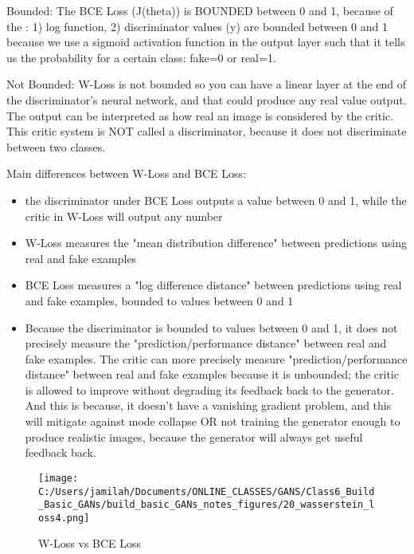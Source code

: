 \documentclass[11pt, onecolumn]{article}
\begin{document}
Bounded:
The BCE Loss (J(theta)) is BOUNDED between 0 and 1, because of the : 1) log function, 2) discriminator values (y) are bounded between 0 and 1 because we use a sigmoid activation function in the output layer such that it tells us the probability for a certain class: fake=0 or real=1.

Not Bounded:
W-Loss is not bounded so you can have a linear layer at the end of the discriminator's neural network, and that could produce any real value output.  The output can be interpreted as how real an image is considered by the critic.  This critic system is NOT called a discriminator, because it does not discriminate between two classes.

Main differences between W-Loss and BCE Loss:
\begin{itemize}
\item the discriminator under BCE Loss outputs a value between 0 and 1, while the critic in W-Loss will output any number
\item W-Loss measures the "mean distribution difference" between predictions using real and fake examples
\item BCE Loss measures a "log difference distance" between predictions using real and fake examples, bounded to values between 0 and 1
\item Because the discriminator is bounded to values between 0 and 1, it does not precisely measure the "prediction/performance distance" between real and fake examples.  The critic can more precisely measure "prediction/performance distance" between real and fake examples because it is unbounded; the critic is allowed to improve without degrading its feedback back to the generator. And this is because, it doesn't have a vanishing gradient problem, and this will mitigate against mode collapse OR not training the generator enough to produce realistic images, because the generator will always get useful feedback back.
\end{itemize}

\begin{figure}[htp]
\begin{center}
\texttt{[image: C:/Users/jamilah/Documents/ONLINE\_CLASSES/GANS/Class6\_Build\_Basic\_GANs/build\_basic\_GANs\_notes\_figures/20\_wasserstein\_loss4.png]}
\end{center}
\caption{W-Loss vs BCE Loss}
\label{20_wasserstein_loss4}
\end{figure}
\end{document}
